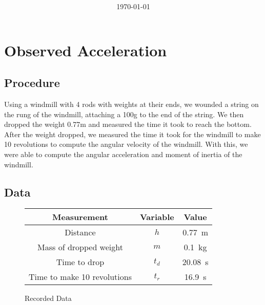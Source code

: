 \documentclass[article, 11pt]{article}
\title{
    \vspace{2in}
    \textmd{\textbf{\labTitle}}
    \normalsize\vspace{0.1in}\\
    \vspace{0.1in}\large{\text{\class: \professor}}
    \vspace{3in}
}
\author{\name}
\date{\today}
\begin{document}
    \maketitle
    \thispagestyle{empty}
    \pagebreak
    
    \section{Observed Acceleration}
    \subsection{Procedure}
    \noindent 
    Using a windmill with 4 rods with weights at their ends, we wounded a string on the rung of the windmill, attaching a 100g to the end of the string. We then dropped the weight 0.77m and measured the time it took to reach the bottom. After the weight dropped, we measured the time it took for the windmill to make 10 revolutions to compute the angular velocity of the windmill. With this, we were able to compute the angular acceleration and moment of inertia of the windmill.

    \subsection{Data}
    \begin{figure}[H]
        \begin{center}
            \begin{tabular}{|c|c|c|}
                \hline
                \textbf{Measurement} & \textbf{Variable} & \textbf{Value} \\
                \hline
                Distance & $h$ & \SI{0.77}{\meter} \\
                Mass of dropped weight & $m$ & \SI{0.1}{\kilogram} \\
                Time to drop & $t_d$ & \SI{20.08}{\second} \\
                Time to make 10 revolutions & $t_r$ & \SI{16.9}{\second} \\
                \hline
            \end{tabular}
        \end{center}
        \caption{Recorded Data}
    \end{figure}
\end{document}
